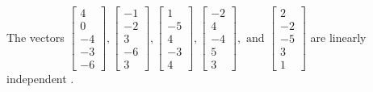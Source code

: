 \begin{exercise}
\begin{exerciseStatement}
  \end{exerciseStatement}
  \begin{exerciseAnswer}
   The vectors \(\left[\begin{array}{r}
4 \\
0 \\
-4 \\
-3 \\
-6
\end{array}\right] , \left[\begin{array}{r}
-1 \\
-2 \\
3 \\
-6 \\
3
\end{array}\right] , \left[\begin{array}{r}
1 \\
-5 \\
4 \\
-3 \\
4
\end{array}\right] , \left[\begin{array}{r}
-2 \\
4 \\
-4 \\
5 \\
3
\end{array}\right] , \text{ and } \left[\begin{array}{r}
2 \\
-2 \\
-5 \\
3 \\
1
\end{array}\right]\) are 
  	 linearly independent  .
  


  \end{exerciseAnswer}
\end{exercise}